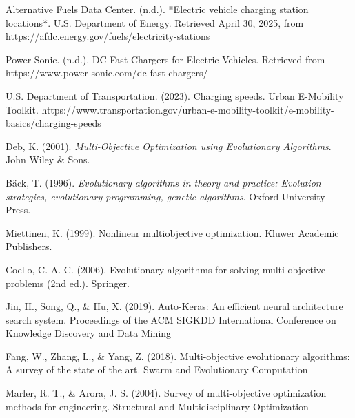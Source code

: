 \begin{thebibliography}{99}
    Alternative Fuels Data Center. (n.d.). *Electric vehicle charging station locations*. U.S. Department of Energy. Retrieved April 30, 2025, from https://afdc.energy.gov/fuels/electricity-stations

    Power Sonic. (n.d.). DC Fast Chargers for Electric Vehicles. Retrieved from https://www.power-sonic.com/dc-fast-chargers/

     U.S. Department of Transportation. (2023). Charging speeds. Urban E-Mobility Toolkit. https://www.transportation.gov/urban-e-mobility-toolkit/e-mobility-basics/charging-speeds
    
    Deb, K. (2001). \textit{Multi-Objective Optimization using Evolutionary Algorithms}. John Wiley \& Sons.

     Bäck, T. (1996). \textit{Evolutionary algorithms in theory and practice: Evolution strategies, evolutionary programming, genetic algorithms}. Oxford University Press.
    
    Miettinen, K. (1999). Nonlinear multiobjective optimization. Kluwer Academic Publishers.

     Coello, C. A. C. (2006). Evolutionary algorithms for solving multi-objective problems (2nd ed.). Springer.

     Jin, H., Song, Q., \& Hu, X. (2019). Auto-Keras: An efficient neural architecture search system. Proceedings of the ACM SIGKDD International Conference on Knowledge Discovery and Data Mining

     Fang, W., Zhang, L., \& Yang, Z. (2018). Multi-objective evolutionary algorithms: A survey of the state of the art. Swarm and Evolutionary Computation

     Marler, R. T., \& Arora, J. S. (2004). Survey of multi-objective optimization methods for engineering. Structural and Multidisciplinary Optimization


\end{thebibliography}
